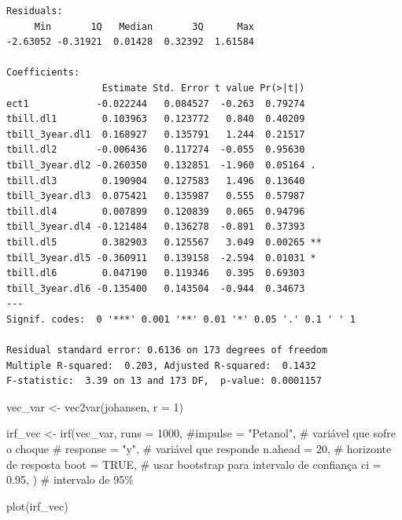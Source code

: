 \documentclass[
  letterpaper,
  DIV=11,
  numbers=noendperiod]{scrartcl}
\newenvironment{Shaded}{\begin{snugshade}}{\end{snugshade}}
\newcommand{\AttributeTok}[1]{\textcolor[rgb]{0.40,0.45,0.13}{#1}}
\newcommand{\CommentTok}[1]{\textcolor[rgb]{0.37,0.37,0.37}{#1}}
\newcommand{\ConstantTok}[1]{\textcolor[rgb]{0.56,0.35,0.01}{#1}}
\newcommand{\DecValTok}[1]{\textcolor[rgb]{0.68,0.00,0.00}{#1}}
\newcommand{\FloatTok}[1]{\textcolor[rgb]{0.68,0.00,0.00}{#1}}
\newcommand{\FunctionTok}[1]{\textcolor[rgb]{0.28,0.35,0.67}{#1}}
\newcommand{\NormalTok}[1]{\textcolor[rgb]{0.00,0.23,0.31}{#1}}
\newcommand{\OtherTok}[1]{\textcolor[rgb]{0.00,0.23,0.31}{#1}}
\begin{document}
\begin{verbatim}
Residuals:
     Min       1Q   Median       3Q      Max 
-2.63052 -0.31921  0.01428  0.32392  1.61584 

Coefficients:
                 Estimate Std. Error t value Pr(>|t|)   
ect1            -0.022244   0.084527  -0.263  0.79274   
tbill.dl1        0.103963   0.123772   0.840  0.40209   
tbill_3year.dl1  0.168927   0.135791   1.244  0.21517   
tbill.dl2       -0.006436   0.117274  -0.055  0.95630   
tbill_3year.dl2 -0.260350   0.132851  -1.960  0.05164 . 
tbill.dl3        0.190904   0.127583   1.496  0.13640   
tbill_3year.dl3  0.075421   0.135987   0.555  0.57987   
tbill.dl4        0.007899   0.120839   0.065  0.94796   
tbill_3year.dl4 -0.121484   0.136278  -0.891  0.37393   
tbill.dl5        0.382903   0.125567   3.049  0.00265 **
tbill_3year.dl5 -0.360911   0.139158  -2.594  0.01031 * 
tbill.dl6        0.047190   0.119346   0.395  0.69303   
tbill_3year.dl6 -0.135400   0.143504  -0.944  0.34673   
---
Signif. codes:  0 '***' 0.001 '**' 0.01 '*' 0.05 '.' 0.1 ' ' 1

Residual standard error: 0.6136 on 173 degrees of freedom
Multiple R-squared:  0.203, Adjusted R-squared:  0.1432 
F-statistic:  3.39 on 13 and 173 DF,  p-value: 0.0001157
\end{verbatim}

\begin{Shaded}
\begin{Highlighting}[]
\NormalTok{vec\_var }\OtherTok{\textless{}{-}} \FunctionTok{vec2var}\NormalTok{(johansen, }\AttributeTok{r =} \DecValTok{1}\NormalTok{)}

\NormalTok{irf\_vec }\OtherTok{\textless{}{-}} \FunctionTok{irf}\NormalTok{(vec\_var,}
               \AttributeTok{runs =} \DecValTok{1000}\NormalTok{,}
               \CommentTok{\#impulse = "Petanol",     \# variável que sofre o choque}
              \CommentTok{\# response = "y",    \# variável que responde}
               \AttributeTok{n.ahead =} \DecValTok{20}\NormalTok{,      }\CommentTok{\# horizonte de resposta}
               \AttributeTok{boot =} \ConstantTok{TRUE}\NormalTok{,       }\CommentTok{\# usar bootstrap para intervalo de confiança}
               \AttributeTok{ci =} \FloatTok{0.95}\NormalTok{,}
\NormalTok{               )         }\CommentTok{\# intervalo de 95\%}

\FunctionTok{plot}\NormalTok{(irf\_vec)}
\end{Highlighting}
\end{Shaded}
\end{document}
